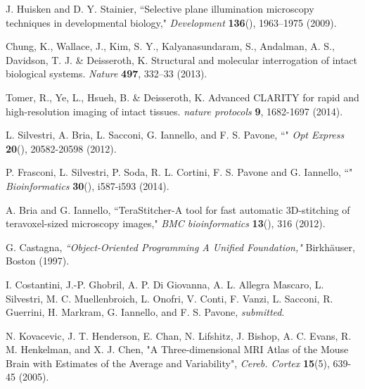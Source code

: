 \documentclass[12pt]{spieman}  %
\begin{document}
\begin{thebibliography}{0}

 J. Huisken and D. Y. Stainier, ``Selective plane illumination microscopy techniques in developmental biology," \emph{Development} \textbf{136}(), 1963–1975 (2009).

 Chung, K., Wallace, J., Kim, S. Y., Kalyanasundaram, S., Andalman, A. S., Davidson, T. J. \& Deisseroth, K. Structural and molecular interrogation of intact biological systems. \emph{Nature} \textbf{497}, 332–33 (2013).

 Tomer, R., Ye, L., Hsueh, B. \& Deisseroth, K. Advanced CLARITY for rapid and high-resolution imaging of intact tissues. \emph{nature protocols} \textbf{9}, 1682-1697 (2014).

 L. Silvestri, A. Bria, L. Sacconi, G. Iannello,  and F. S. Pavone,  ``" \emph{Opt Express} \textbf{20}(), 20582-20598 (2012).

 P. Frasconi, L. Silvestri, P. Soda, R. L. Cortini, F. S. Pavone and G. Iannello, ``" \emph{Bioinformatics} \textbf{30}(), i587-i593 (2014).

 A. Bria and G. Iannello,  ``TeraStitcher-A tool for fast automatic 3D-stitching of teravoxel-sized microscopy images,"  \emph{BMC bioinformatics} \textbf{13}(), 316 (2012).

 G. Castagna, \emph{``Object-Oriented Programming A Unified Foundation,"} Birkh{\"a}user, Boston (1997).

 I. Costantini, J.-P. Ghobril, A. P. Di Giovanna, A. L. Allegra Mascaro, L. Silvestri, M. C. Muellenbroich, L. Onofri, V. Conti, F. Vanzi, L. Sacconi, R. Guerrini, H. Markram, G. Iannello, and F. S. Pavone, \emph{submitted}.

 N. Kovacevic, J. T. Henderson, E. Chan, N. Lifshitz, J. Bishop, A. C. Evans, R. M. Henkelman, and X. J. Chen, "A Three-dimensional MRI Atlas of the Mouse Brain with Estimates of the Average and Variability", \emph{Cereb. Cortex} \textbf{15}(5), 639-45 (2005).

\end{thebibliography}


\listoffigures



\listoftables

\end{document}
